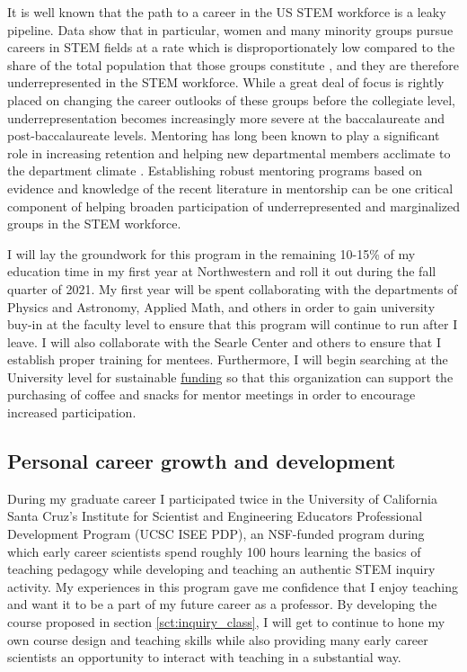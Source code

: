 \documentclass[aasms,11pt]{article}
\begin{document}
It is well known that the path to a career in the US STEM workforce is a leaky pipeline.
Data show that in particular, women and many minority groups pursue careers in STEM fields at a rate which is disproportionately low compared to the share of the total population that those groups constitute \citep{corbett&hill2015, nsf2019}, and they are therefore underrepresented in the STEM workforce.
While a great deal of focus is rightly placed on changing the career outlooks of these groups before the collegiate level, underrepresentation becomes increasingly more severe at the baccalaureate and post-baccalaureate levels.
Mentoring has long been known to play a significant role in increasing retention and helping new departmental members acclimate to the department climate \citep{hunt&michael1983}.
Establishing robust mentoring programs based on evidence and knowledge of the recent literature in mentorship \citep[as in e.g.,][]{crisp&all2009, crisp&all2017} can be one critical component of helping broaden participation of underrepresented and marginalized groups in the STEM workforce.

I will lay the groundwork for this program in the remaining 10-15\% of my education time in my first year at Northwestern and roll it out during the fall quarter of 2021.
My first year will be spent collaborating with the departments of Physics and Astronomy, Applied Math, and others in order to gain university buy-in at the faculty level to ensure that this program will continue to run after I leave.
I will also collaborate with the Searle Center and others to ensure that I establish proper training for mentees.
Furthermore, I will begin searching at the University level for sustainable \href{https://www.northwestern.edu/studentorgs/org-officers/funding/index.html}{funding} so that this organization can support the purchasing of coffee and snacks for mentor meetings in order to encourage increased participation.

\subsection{Personal career growth and development}
\label{sct:personal_growth}
During my graduate career I participated twice in the University of California Santa Cruz's Institute for Scientist and Engineering Educators Professional Development Program (UCSC ISEE PDP), an NSF-funded program during which early career scientists spend roughly 100 hours learning the basics of teaching pedagogy while developing and teaching an authentic STEM inquiry activity.
My experiences in this program gave me confidence that I enjoy teaching and want it to be a part of my future career as a professor.
By developing the course proposed in section \ref{sct:inquiry_class}, I will get to continue to hone my own course design and teaching skills while also providing many early career scientists an opportunity to interact with teaching in a substantial way.
\end{document}
